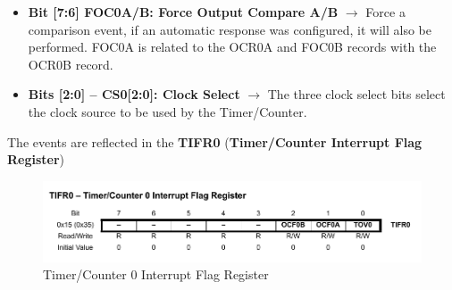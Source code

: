 \begin{itemize}
    \item \textbf{Bit [7:6] FOC0A/B: Force Output Compare A/B} $\bm{\rightarrow}$  Force a comparison event, if an automatic response was configured, it will also be performed. FOC0A is related to the OCR0A and FOC0B records with the OCR0B record.
    
    \item \textbf{Bits [2:0] – CS0[2:0]: Clock Select} $\bm{\rightarrow}$ The three clock select bits select the clock source to be used by the Timer/Counter.
    
    \begin{table}[H]
    \end{table}
    
\end{itemize}

The events are reflected in the \textbf{TIFR0} (\textbf{Timer/Counter Interrupt Flag Register})

\begin{figure}[H]
    \centering
    \includegraphics[width = \textwidth]{Graphics/MICROS/Practice 4/DATASHEET/TIFR0.pdf}
    \caption{Timer/Counter 0 Interrupt Flag Register}
    \label{fig:TIFR0}
\end{figure}



